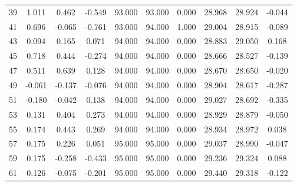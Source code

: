 \begin{table}[t]
\begin{tabular}{cccccccccc}
39 & 1.011 & 0.462 & -0.549 & 93.000 & 93.000 & 0.000 & 28.968 & 28.924 & -0.044 \\
41 & 0.696 & -0.065 & -0.761 & 93.000 & 94.000 & 1.000 & 29.004 & 28.915 & -0.089 \\
43 & 0.094 & 0.165 & 0.071 & 94.000 & 94.000 & 0.000 & 28.883 & 29.050 & 0.168 \\
45 & 0.718 & 0.444 & -0.274 & 94.000 & 94.000 & 0.000 & 28.666 & 28.527 & -0.139 \\
47 & 0.511 & 0.639 & 0.128 & 94.000 & 94.000 & 0.000 & 28.670 & 28.650 & -0.020 \\
49 & -0.061 & -0.137 & -0.076 & 94.000 & 94.000 & 0.000 & 28.904 & 28.617 & -0.287 \\
51 & -0.180 & -0.042 & 0.138 & 94.000 & 94.000 & 0.000 & 29.027 & 28.692 & -0.335 \\
53 & 0.131 & 0.404 & 0.273 & 94.000 & 94.000 & 0.000 & 28.929 & 28.879 & -0.050 \\
55 & 0.174 & 0.443 & 0.269 & 94.000 & 94.000 & 0.000 & 28.934 & 28.972 & 0.038 \\
57 & 0.175 & 0.226 & 0.051 & 95.000 & 95.000 & 0.000 & 29.037 & 28.990 & -0.047 \\
59 & 0.175 & -0.258 & -0.433 & 95.000 & 95.000 & 0.000 & 29.236 & 29.324 & 0.088 \\
61 & 0.126 & -0.075 & -0.201 & 95.000 & 95.000 & 0.000 & 29.440 & 29.318 & -0.122 \\
\hline
\end{tabular}
\end{table}
